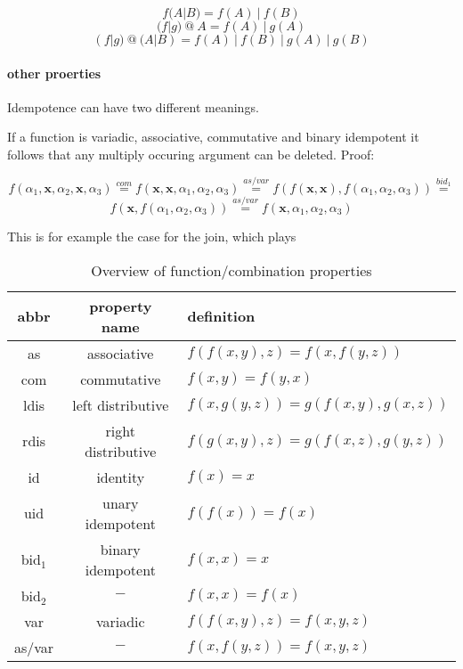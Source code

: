 \documentclass[english]{article}
\begin{document}
$$f(A|B) = f(A)\ |\ f(B)$$
$$(f|g)\ @\ A = f(A)\ |\ g(A)$$
$$(f|g)\ @\ (A|B) = f(A)\ |\ f(B)\ |\ g(A)\ |\ g(B)$$

\paragraph{other proerties}
Idempotence can have two different meanings.

If a function is variadic, associative, commutative and binary idempotent it follows that any multiply occuring argument can be deleted. Proof:

$$f(\alpha_1, \mathbf{x}, \alpha_2, \mathbf{x}, \alpha_3) \stackrel{com}{=}
f(\mathbf{x},\mathbf{x}, \alpha_1, \alpha_2, \alpha_3) \stackrel{as/var}{=}
f(f(\mathbf{x},\mathbf{x}), f(\alpha_1, \alpha_2, \alpha_3)) \stackrel{bid_1}{=}$$
$$f(\mathbf{x}, f(\alpha_1, \alpha_2, \alpha_3)) \stackrel{as/var}{=}
f(\mathbf{x}, \alpha_1, \alpha_2, \alpha_3)$$

This is for example the case for the join, which plays


\begin{table}
\centering
\begin{tabular}{c | c | l}
abbr & property name & definition \\
\hline
as               & associative        & $f(f(x,y),z) = f(x,f(y,z))$ \\
com              & commutative        & $f(x,y)=f(y,x)$ \\
ldis             & left distributive  & $f(x,g(y,z))=g(f(x,y),g(x,z))$ \\
rdis             & right distributive & $f(g(x,y),z)=g(f(x,z),g(y,z))$ \\
id               & identity           & $f(x) = x$ \\
uid              & unary idempotent   & $f(f(x)) = f(x)$ \\
bid$_{\text{1}}$ & binary idempotent  & $f(x,x) = x$ \\
bid$_{\text{2}}$ & \multicolumn{1}{|c|}{$-$} & $f(x,x) = f(x)$ \\
var              & variadic           & $f(f(x,y),z) = f(x,y,z)$\\
as/var           & \multicolumn{1}{|c|}{$-$} & $f(x,f(y,z)) = f(x,y,z)$ \\
\end{tabular}
\caption{Overview of function/combination properties}
\label{funcprops}
\end{table}
\end{document}
